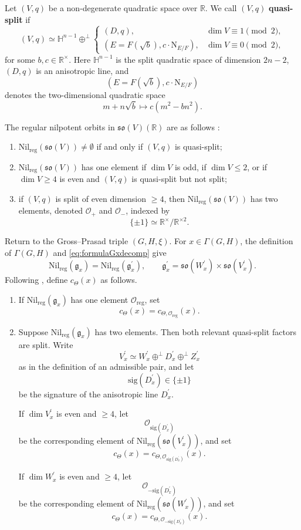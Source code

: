 \documentclass[12pt]{amsart}
\numberwithin{equation}{subsection}
\newcommand{\BH}{{\mathbb {H}}}
\newcommand{\BR}{{\mathbb {R}}}
\newcommand{\CO}{{\mathcal {O}}}
\newcommand{\Fg}{{\mathfrak {g}}}
\newcommand{\Fo}{{\mathfrak {o}}}
\newcommand{\Fs}{{\mathfrak {s}}}
\newcommand{\RN}{{\mathrm {N}}}
\newcommand{\reg}{{\mathrm{reg}}}
\def\nil{\mathrm{Nil}}
\def\Gam{{\Gamma}}
\def\p{\prime}
\begin{document}
Let $(V,q)$ be a non-degenerate quadratic space over $\BR$. We call $(V,q)$
\textbf{quasi-split} if
\begin{equation}\label{eq:qsquadraticsp}
(V,q)
\simeq
\BH^{n-1}\oplus^\perp
\begin{cases}
(D,q), & \dim V\equiv 1\pmod 2,\\
(E=F(\sqrt b),c\cdot \RN_{E/F}), & \dim V\equiv 0\pmod 2,
\end{cases}
\end{equation}
for some $b,c\in \BR^\times$. Here $\BH^{n-1}$ is the split quadratic space of
dimension $2n-2$, $(D,q)$ is an anisotropic line, and
\[
(E=F(\sqrt b),c\cdot \RN_{E/F})
\]
denotes the two-dimensional quadratic space
\[
m+n\sqrt b\longmapsto c(m^2-bn^2).
\]

The regular nilpotent orbits in $\Fs\Fo(V)(\BR)$ are as follows
\cite[\S 6.1.2]{thesis_zhilin}:
\begin{enumerate}
\item $\nil_\reg(\Fs\Fo(V))\neq \emptyset$ if and only if $(V,q)$ is
quasi-split;

\item $\nil_\reg(\Fs\Fo(V))$ has one element if $\dim V$ is odd, if
$\dim V\leq 2$, or if $\dim V\geq 4$ is even and $(V,q)$ is quasi-split but not
split;

\item if $(V,q)$ is split of even dimension $\geq 4$, then
$\nil_\reg(\Fs\Fo(V))$ has two elements, denoted $\CO_+$ and $\CO_-$, indexed
by
\[
\{\pm 1\}\simeq \BR^\times/\BR^{\times 2}.
\]
\end{enumerate}

Return to the Gross--Prasad triple $(G,H,\xi)$. For $x\in \Gam(G,H)$, the
definition of $\Gam(G,H)$ and \eqref{eq:formulaGxdecomp} give
\[
\nil_\reg(\Fg_x)=\nil_\reg(\Fg^\p_x),
\qquad
\Fg^\p_x=\Fs\Fo(W^\p_x)\times \Fs\Fo(V^\p_x).
\]
Following \cite[\S 7.3.2]{thesis_zhilin}, define $c_\Theta(x)$ as follows.
\begin{enumerate}
\item If $\nil_\reg(\Fg_x)$ has one element $\CO_\reg$, set
\[
c_\Theta(x)=c_{\Theta,\CO_\reg}(x).
\]

\item Suppose $\nil_\reg(\Fg_x)$ has two elements. Then both relevant
quasi-split factors are split. Write
\[
V^\p_x\simeq W^\p_x\oplus^\perp D^\p_x\oplus^\perp Z^\p_x
\]
as in the definition of an admissible pair, and let
\[
\mathrm{sig}(D^\p_x)\in \{\pm 1\}
\]
be the signature of the anisotropic line $D^\p_x$.

If $\dim V^\p_x$ is even and $\geq 4$, let
\[
\CO_{\mathrm{sig}(D^\p_x)}
\]
be the corresponding element of $\nil_\reg(\Fs\Fo(V^\p_x))$, and set
\[
c_\Theta(x)=c_{\Theta,\CO_{\mathrm{sig}(D^\p_x)}}(x).
\]

If $\dim W^\p_x$ is even and $\geq 4$, let
\[
\CO_{-\mathrm{sig}(D^\p_x)}
\]
be the corresponding element of $\nil_\reg(\Fs\Fo(W^\p_x))$, and set
\[
c_\Theta(x)=c_{\Theta,\CO_{-\mathrm{sig}(D^\p_x)}}(x).
\]
\end{enumerate}
\end{document}
